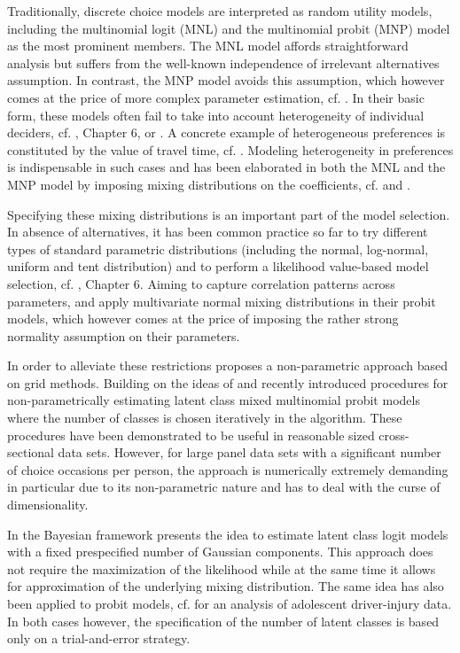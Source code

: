 \documentclass[article]{jss}
\begin{document}
Traditionally, discrete choice models are interpreted as random utility models, including the multinomial logit (MNL) and the multinomial probit (MNP) model as the most prominent members. The MNL model affords straightforward analysis but suffers from the well-known independence of irrelevant alternatives assumption. In contrast, the MNP model avoids this assumption, which however comes at the price of more complex parameter estimation, cf. \cite{Train:2009}. In their basic form, these models often fail to take into account heterogeneity of individual deciders, cf. \cite{Train:2009}, Chapter 6, or \cite{Train:2016}. A concrete example of heterogeneous preferences is constituted by the value of travel time, cf. \cite{Cirillo:2006}. Modeling heterogeneity in preferences is indispensable in such cases and has been elaborated in both the MNL and the MNP model by imposing mixing distributions on the coefficients, cf. \cite{Train:2009} and \cite{Bhat:2011}.

Specifying these mixing distributions is an important part of the model selection. In absence of alternatives, it has been common practice so far to try different types of standard parametric distributions (including the normal, log-normal, uniform and tent distribution) and to perform a likelihood value-based model selection, cf. \cite{Train:2009}, Chapter 6. Aiming to capture correlation patterns across parameters, \cite{Fountas:2018} and \cite{Fountas:2019} apply multivariate normal mixing distributions in their probit models, which however comes at the price of imposing the rather strong normality assumption on their parameters.

In order to alleviate these restrictions \cite{Train:2016} proposes a non-parametric approach based on grid methods. Building on the ideas of \cite{Train:2016} and \cite{Bhat:2018} recently \cite{Bauer:2019} introduced procedures for non-parametrically estimating latent class mixed multinomial probit models where the number of classes is chosen iteratively in the algorithm. These procedures have been demonstrated to be useful in reasonable sized cross-sectional data sets. However, for large panel data sets with a significant number of choice occasions per person, the approach is numerically extremely demanding in particular due to its non-parametric nature and has to deal with the curse of dimensionality.

In the Bayesian framework \cite{Scaccia:2010} presents the idea to estimate latent class logit models with a fixed prespecified number of Gaussian components. This approach does not require the maximization of the likelihood while at the same time it allows for approximation of the underlying mixing distribution. The same idea has also been applied to probit models, cf. \cite{Xiong:2013} for an analysis of adolescent driver-injury data. In both cases however, the specification of the number of latent classes is based only on a trial-and-error strategy.
\end{document}
